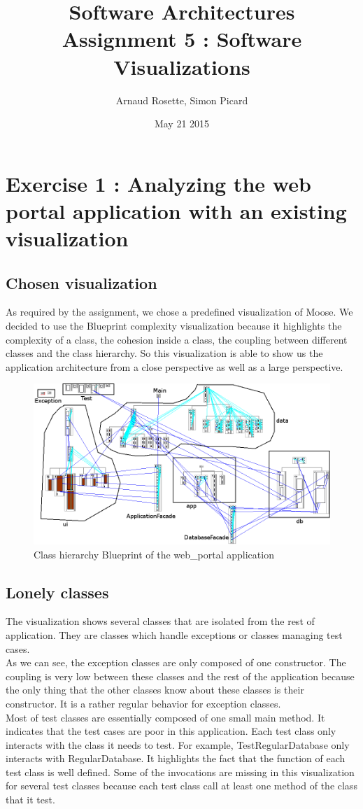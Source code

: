 \documentclass[a4paper,10pt]{article}
\title{Software Architectures\\ Assignment 5 : Software Visualizations}
\author{Arnaud Rosette, Simon Picard}
\date{May 21 2015}
\begin{document}
\maketitle
\section{Exercise 1 : Analyzing the web portal application with an existing visualization}
\subsection{Chosen visualization}
As required by the assignment, we chose a predefined visualization of Moose. We decided to use the Blueprint complexity visualization because it highlights the complexity of a class, the cohesion inside a class, the coupling between different classes and the class hierarchy. So this visualization is able to show us the application architecture from a close perspective as well as a large perspective.
\begin{figure}[H]
\includegraphics[width=\textwidth]{src/blueprint.png}
\centering
\caption{Class hierarchy Blueprint of the web\_portal application}
\end{figure}
\subsection{Lonely classes}
The visualization shows several classes that are isolated from the rest of application. They are classes which handle exceptions or classes managing test cases.\\
As we can see, the exception classes are only composed of one constructor. The coupling is very low between these classes and the rest of the application because the only thing that the other classes know about these classes is their constructor. It is a rather regular behavior for exception classes.\\
Most of test classes are essentially composed of one small  main method. It indicates that the test cases are poor in this application. Each test class only interacts with the class it needs to test. For example, TestRegularDatabase only interacts with RegularDatabase. It highlights the fact that the function of each test class is well defined. Some of the invocations are missing in this visualization for several test classes because each test class call at least one method of the class that it test.
\end{document}
